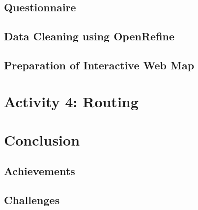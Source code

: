 \documentclass[a4paper,12pt,twoside]{article}
\begin{document}
    \begin{multicols}{2}
    \lipsum[0-5]
    \end{multicols}

\subsection{Questionnaire}

    \begin{multicols}{2}
    \lipsum[0-5]
    \end{multicols}

\subsection{Data Cleaning using OpenRefine}

    \begin{multicols}{2}
    \lipsum[0-5]
    \end{multicols}

\subsection{Preparation of Interactive Web Map}

    \begin{multicols}{2}
    \lipsum[0-5]
    \end{multicols}

\section{Activity 4: Routing}

\section{Conclusion}

    \begin{multicols}{2}
    \lipsum[0-5]
    \end{multicols}

\subsection{Achievements}

    \begin{multicols}{2}
    \lipsum[0-5]
    \end{multicols}

\subsection{Challenges}
\end{document}
